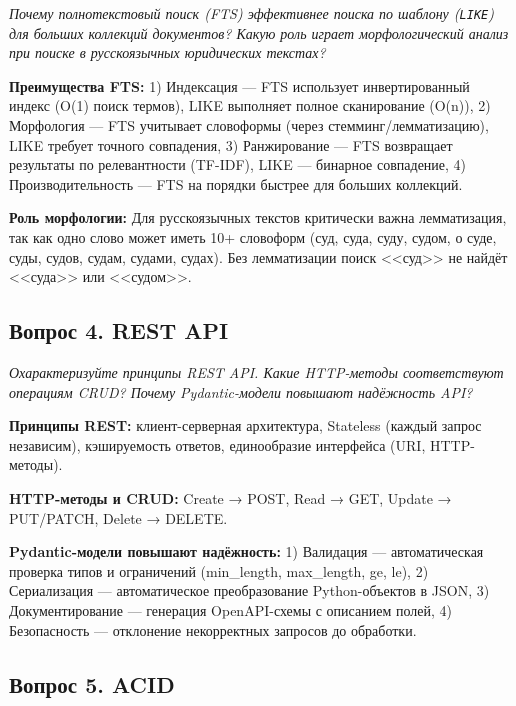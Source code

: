 \documentclass[a4paper,12pt]{article}
\begin{document}
\textit{Почему полнотекстовый поиск (FTS) эффективнее поиска по шаблону (\texttt{LIKE}) для больших коллекций документов? Какую роль играет морфологический анализ при поиске в русскоязычных юридических текстах?}

\begin{infobox}
\textbf{Преимущества FTS:} 1) Индексация — FTS использует инвертированный индекс (O(1) поиск термов), LIKE выполняет полное сканирование (O(n)), 2) Морфология — FTS учитывает словоформы (через стемминг/лемматизацию), LIKE требует точного совпадения, 3) Ранжирование — FTS возвращает результаты по релевантности (TF-IDF), LIKE — бинарное совпадение, 4) Производительность — FTS на порядки быстрее для больших коллекций.

\textbf{Роль морфологии:} Для русскоязычных текстов критически важна лемматизация, так как одно слово может иметь 10+ словоформ (суд, суда, суду, судом, о суде, суды, судов, судам, судами, судах). Без лемматизации поиск <<суд>> не найдёт <<суда>> или <<судом>>.
\end{infobox}

\subsection*{Вопрос 4. REST API}

\textit{Охарактеризуйте принципы REST API. Какие HTTP-методы соответствуют операциям CRUD? Почему Pydantic-модели повышают надёжность API?}

\begin{infobox}
\textbf{Принципы REST:} клиент-серверная архитектура, Stateless (каждый запрос независим), кэшируемость ответов, единообразие интерфейса (URI, HTTP-методы).

\textbf{HTTP-методы и CRUD:} Create → POST, Read → GET, Update → PUT/PATCH, Delete → DELETE.

\textbf{Pydantic-модели повышают надёжность:} 1) Валидация — автоматическая проверка типов и ограничений (min\_length, max\_length, ge, le), 2) Сериализация — автоматическое преобразование Python-объектов в JSON, 3) Документирование — генерация OpenAPI-схемы с описанием полей, 4) Безопасность — отклонение некорректных запросов до обработки.
\end{infobox}

\subsection*{Вопрос 5. ACID}
\end{document}
